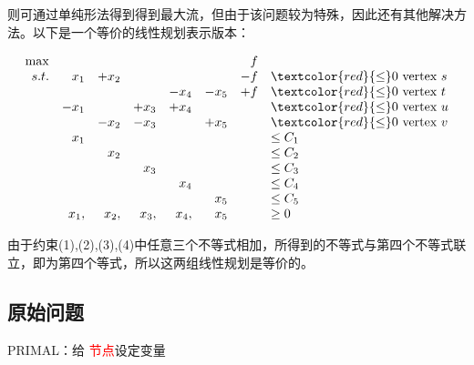   则可通过单纯形法得到得到最大流，但由于该问题较为特殊，因此还有其他解决方法。以下是一个等价的线性规划表示版本：

\begin{small}
\[
\begin{array}{rrrrrrrl}
 \max &         &            &          &            &           &    f   &\\
 s.t.     & x_1  & +x_2 &           &            &           &-f   & \textcolor{red}{\leq} 0  \text{ vertex } s\\
        &        &             &           &    -x_4 & -x_5 &+f & \textcolor{red}{\leq} 0  \text{ vertex } t\\
        & -x_1&            & +x_3 &+x_4   &         &      & \textcolor{red}{\leq}0  \text{ vertex } u\\
        &         &-x_2    & -x_3   &            &+x_5 &     & \textcolor{red}{\leq}0  \text{ vertex } v\\
        & x_1  &           &            &            &          &     & \leq C_1 \\
        &   &   x_2        &            &            &          &     & \leq C_2 \\
        &        &           &  x_{3}          &            &          &     & \leq C_3 \\
        &        &           &            &      x_{4}      &          &     & \leq C_4 \\
        &        &           &            &            &   x_{5}       &     & \leq C_5 \\
        & x_1,  &  x_{2},         &   x_{3},         &    x_{4},        &  x_{5}        &     & \geq 0 \\
\end{array} \nonumber
\]
\end{small}

由于约束(1),(2),(3),(4)中任意三个不等式相加，所得到的不等式与第四个不等式联立，即为第四个等式，所以这两组线性规划是等价的。

\subsection{原始问题}
{\sc PRIMAL}：给 \textcolor{red}{节点}设定变量

